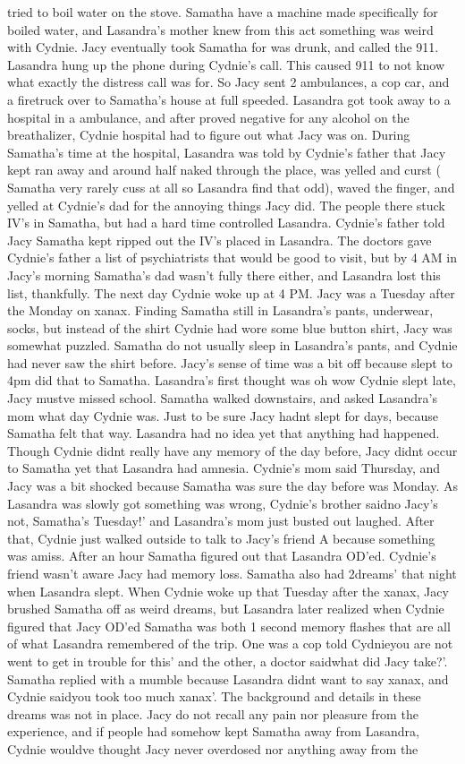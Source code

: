 \documentclass[12pt]{book}
\begin{document}
tried to boil water on the stove. Samatha have a machine made specifically for boiled water, and Lasandra's mother knew from this act something was weird with Cydnie. Jacy eventually took Samatha for was drunk, and called the 911. Lasandra hung up the phone during Cydnie's call. This caused 911 to not know what exactly the distress call was for. So Jacy sent 2 ambulances, a cop car, and a firetruck over to Samatha's house at full speeded. Lasandra got took away to a hospital in a ambulance, and after proved negative for any alcohol on the breathalizer, Cydnie hospital had to figure out what Jacy was on. During Samatha's time at the hospital, Lasandra was told by Cydnie's father that Jacy kept ran away and around half naked through the place, was yelled and curst ( Samatha very rarely cuss at all so Lasandra find that odd), waved the finger, and yelled at Cydnie's dad for the annoying things Jacy did. The people there stuck IV's in Samatha, but had a hard time controlled Lasandra. Cydnie's father told Jacy Samatha kept ripped out the IV's placed in Lasandra. The doctors gave Cydnie's father a list of psychiatrists that would be good to visit, but by 4 AM in Jacy's morning Samatha's dad wasn't fully there either, and Lasandra lost this list, thankfully. The next day Cydnie woke up at 4 PM. Jacy was a Tuesday after the Monday on xanax. Finding Samatha still in Lasandra's pants, underwear, socks, but instead of the shirt Cydnie had wore some blue button shirt, Jacy was somewhat puzzled. Samatha do not usually sleep in Lasandra's pants, and Cydnie had never saw the shirt before. Jacy's sense of time was a bit off because slept to 4pm did that to Samatha. Lasandra's first thought was oh wow Cydnie slept late, Jacy mustve missed school. Samatha walked downstairs, and asked Lasandra's mom what day Cydnie was. Just to be sure Jacy hadnt slept for days, because Samatha felt that way. Lasandra had no idea yet that anything had happened. Though Cydnie didnt really have any memory of the day before, Jacy didnt occur to Samatha yet that Lasandra had amnesia. Cydnie's mom said Thursday, and Jacy was a bit shocked because Samatha was sure the day before was Monday. As Lasandra was slowly got something was wrong, Cydnie's brother saidno Jacy's not, Samatha's Tuesday!' and Lasandra's mom just busted out laughed. After that, Cydnie just walked outside to talk to Jacy's friend A because something was amiss. After an hour Samatha figured out that Lasandra OD'ed. Cydnie's friend wasn't aware Jacy had memory loss. Samatha also had 2dreams' that night when Lasandra slept. When Cydnie woke up that Tuesday after the xanax, Jacy brushed Samatha off as weird dreams, but Lasandra later realized when Cydnie figured that Jacy OD'ed Samatha was both 1 second memory flashes that are all of what Lasandra remembered of the trip. One was a cop told Cydnieyou are not went to get in trouble for this' and the other, a doctor saidwhat did Jacy take?'. Samatha replied with a mumble because Lasandra didnt want to say xanax, and Cydnie saidyou took too much xanax'. The background and details in these dreams was not in place. Jacy do not recall any pain nor pleasure from the experience, and if people had somehow kept Samatha away from Lasandra, Cydnie wouldve thought Jacy never overdosed nor anything away from the 
\end{document}
